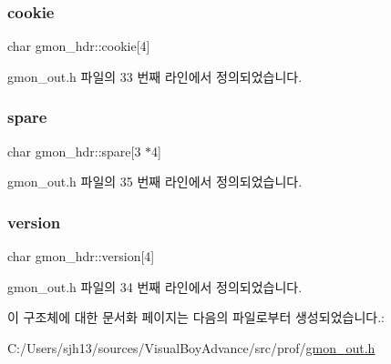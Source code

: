 \subsubsection{\texorpdfstring{cookie}{cookie}}
{\footnotesize\ttfamily char gmon\+\_\+hdr\+::cookie\mbox{[}4\mbox{]}}



gmon\+\_\+out.\+h 파일의 33 번째 라인에서 정의되었습니다.

\mbox{\label{structgmon__hdr_a6d6fb9f3dc97f964c24f900cace54992}} 
\subsubsection{\texorpdfstring{spare}{spare}}
{\footnotesize\ttfamily char gmon\+\_\+hdr\+::spare\mbox{[}3 $\ast$4\mbox{]}}



gmon\+\_\+out.\+h 파일의 35 번째 라인에서 정의되었습니다.

\mbox{\label{structgmon__hdr_a7c55998776369522f545c4d74889d92e}} 
\subsubsection{\texorpdfstring{version}{version}}
{\footnotesize\ttfamily char gmon\+\_\+hdr\+::version\mbox{[}4\mbox{]}}



gmon\+\_\+out.\+h 파일의 34 번째 라인에서 정의되었습니다.



이 구조체에 대한 문서화 페이지는 다음의 파일로부터 생성되었습니다.\+:\begin{DoxyCompactItemize}
\item 
C\+:/\+Users/sjh13/sources/\+Visual\+Boy\+Advance/src/prof/\mbox{\hyperlink{gmon__out_8h}{gmon\+\_\+out.\+h}}\end{DoxyCompactItemize}

